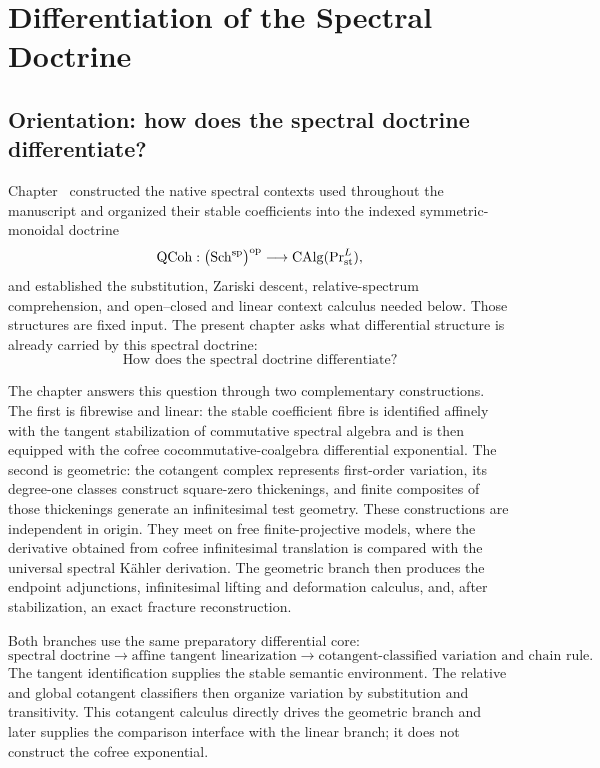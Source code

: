 \chapter{Differentiation of the Spectral Doctrine}
\label{chap:differentiation-spectral-doctrine}

\section{Orientation: how does the spectral doctrine differentiate?}
\label{sec:differentiation-orientation}

Chapter~ constructed the native
spectral contexts used throughout the manuscript and organized their stable
coefficients into the indexed symmetric-monoidal doctrine
\[
    \operatorname{QCoh}:
    \bigl(\operatorname{Sch}^{\mathrm{sp}}\bigr)^{\mathrm{op}}
    \longrightarrow
    \operatorname{CAlg}(\operatorname{Pr}^L_{\mathrm{st}}),
\]
and established the substitution, Zariski descent, relative-spectrum
comprehension, and open--closed and linear context calculus needed below.
Those structures are fixed input. The present chapter asks what differential
structure is already carried by this spectral doctrine:
\[
    \boxed{\text{How does the spectral doctrine differentiate?}}
\]

The chapter answers this question through two complementary constructions.
The first is fibrewise and linear: the stable coefficient fibre is identified
affinely with the tangent stabilization of commutative spectral algebra and is
then equipped with the cofree cocommutative-coalgebra differential
exponential. The second is geometric: the cotangent complex represents
first-order variation, its degree-one classes construct square-zero
thickenings, and finite composites of those thickenings generate an
infinitesimal test geometry. These constructions are independent in origin.
They meet on free finite-projective models, where the derivative obtained from
cofree infinitesimal translation is compared with the universal spectral
K\"ahler derivation. The geometric branch then produces the endpoint
adjunctions, infinitesimal lifting and deformation calculus, and, after
stabilization, an exact fracture reconstruction.

Both branches use the same preparatory differential core:
\[
\boxed{
\text{spectral doctrine}
\longrightarrow
\text{affine tangent linearization}
\longrightarrow
\text{cotangent-classified variation and chain rule}.
}
\]
The tangent identification supplies the stable semantic environment. The
relative and global cotangent classifiers then organize variation by
substitution and transitivity. This cotangent calculus directly drives the
geometric branch and later supplies the comparison interface with the linear
branch; it does not construct the cofree exponential.

